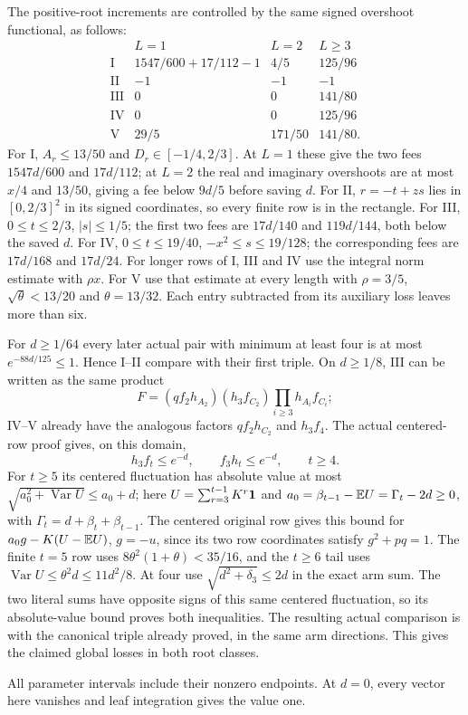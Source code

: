 The positive-root increments are controlled by the same signed
overshoot functional, as follows:
\[
\begin{array}{c|ccc}
 &L=1&L=2&L\ge3\\\hline
 \mathrm I&1547/600+17/112-1&4/5&125/96\\
 \mathrm {II}&-1&-1&-1\\
 \mathrm {III}&0&0&141/80\\
 \mathrm {IV}&0&0&125/96\\
 \mathrm V&29/5&171/50&141/80.
\end{array}
\]
For I, $A_r\le13/50$ and $D_r\in[-1/4,2/3]$.
At $L=1$ these give the two fees $1547d/600$ and $17d/112$;
at $L=2$ the real and imaginary overshoots are at most $x/4$
and $13/50$, giving a fee below $9d/5$ before saving $d$.
For II, $r=-t+zs$ lies in $[0,2/3]^2$ in its signed coordinates,
so every finite row is in the rectangle.
For III, $0\le t\le2/3$, $|s|\le1/5$; the first two fees
are $17d/140$ and $119d/144$, both below the saved $d$.
For IV, $0\le t\le19/40$, $-x^2\le s\le19/128$;
the corresponding fees are $17d/168$ and $17d/24$.
For longer rows of I, III and IV use the integral norm estimate
with $\rho x$. For V use that estimate at every length with
$\rho=3/5$, $\sqrt\theta<13/20$ and $\theta=13/32$.
Each entry subtracted from its auxiliary loss leaves more than six.

For $d\ge1/64$ every later actual pair with minimum at least
four is at most $e^{-88d/125}\le1$. Hence I--II compare with
their first triple. On $d\ge1/8$, III can be written as the
same product
\[
 F=(qf_2h_{A_2})(h_3f_{C_2})\prod_{i\ge3}h_{A_i}f_{C_i};
\]
IV--V already have the analogous factors $qf_2h_{C_2}$ and
$h_3f_4$. The actual centered-row proof gives, on this domain,
\begin{equation}\label{eq:odd-q:high-three-pair}
 h_3f_t\le e^{-d},\qquad f_3h_t\le e^{-d},\qquad t\ge4.
\end{equation}
For $t\ge5$ its centered fluctuation has absolute value at most
$\sqrt{a_0^2+\operatorname{Var}U}\le a_0+d$;
here $U=\sum_{r=3}^{t-1}K^r\mathbf1$ and
$a_0=\beta_{t-1}-\mathbb E U=\Gamma_t-2d\ge0$, with
$\Gamma_t=d+\beta_t+\beta_{t-1}$.
The centered original row gives this bound for
$a_0g-K(U-\mathbb E U)$, $g=-u$, since its two row coordinates satisfy
$g^2+pq=1$. The finite $t=5$ row uses
$8\theta^2(1+\theta)<35/16$, and the $t\ge6$ tail uses
$\operatorname{Var}U\le\theta^2d\le11d^2/8$.
At four use $\sqrt{d^2+\delta_3}\le2d$ in the exact arm sum.
The two literal sums have opposite signs of this same centered
fluctuation, so its absolute-value bound proves both inequalities.
The resulting actual comparison is with the canonical triple
already proved, in the same arm directions. This gives the
claimed global losses in both root classes.

All parameter intervals include their nonzero endpoints.
At $d=0$, every vector here vanishes and leaf integration gives
the value one.
